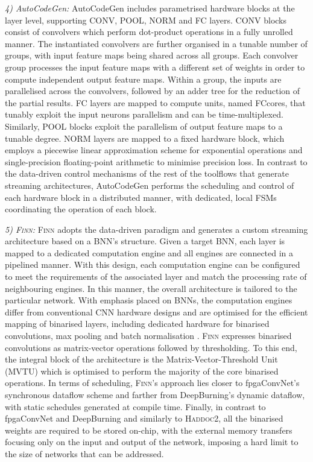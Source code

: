 \documentclass[format=acmsmall, review=false, screen=true]{acmart}
\begin{document}
{\color{black}\textit{4) AutoCodeGen:} 
AutoCodeGen includes parametrised hardware blocks at the layer level, supporting CONV, POOL, NORM and FC layers. CONV blocks consist of convolvers which perform dot-product operations in a fully unrolled manner. The instantiated convolvers are further organised in a tunable number of groups, with input feature maps being shared across all groups. Each convolver group processes the input feature maps with a different set of weights in order to compute independent output feature maps. Within a group, the inputs are parallelised across the convolvers, followed by an adder tree for the reduction of the partial results. FC layers are mapped to compute units, named FCcores, that tunably exploit the input neurons parallelism and can be time-multiplexed. Similarly, POOL blocks exploit the parallelism of output feature maps to a tunable degree. NORM layers are mapped to a fixed hardware block, which employs a piecewise linear approximation scheme for exponential operations and single-precision floating-point arithmetic to minimise precision loss. In contrast to the data-driven control mechanisms of the rest of the toolflows that generate streaming architectures, AutoCodeGen performs the scheduling and control of each hardware block in a distributed manner, with dedicated, local FSMs coordinating the operation of each block.

}


\textit{5) \textsc{Finn}:}
\textsc{Finn} adopts the data-driven paradigm and generates a custom streaming architecture based on a BNN's structure. Given a target BNN, each layer is mapped to a dedicated computation engine and all engines are connected in a pipelined manner. With this design, each computation engine can be configured to meet the requirements of the associated layer and match the processing rate of neighbouring engines. In this manner, the overall architecture is tailored to the particular network. With emphasis placed on BNNs, the computation engines differ from conventional CNN hardware designs and are optimised for the efficient mapping of binarised layers, including dedicated hardware for binarised convolutions, max pooling and batch normalisation \cite{icml2015_ioffe15}. \textsc{Finn} expresses binarised convolutions as matrix-vector operations followed by thresholding. To this end, the integral block of the architecture is the Matrix-Vector-Threshold Unit (MVTU) which is optimised to perform %
the majority of the core binarised operations. In terms of scheduling, \textsc{Finn}'s approach lies closer to fpgaConvNet's synchronous dataflow scheme and farther from DeepBurning's dynamic dataflow, with static schedules generated at compile time. %
Finally, in contrast to fpgaConvNet and DeepBurning {\color{black}and similarly to \textsc{Haddoc2}}, all the binarised weights are required to be stored on-chip, with the external memory transfers focusing only on the input and output of the network, imposing a hard limit to the size of networks that can be addressed.
\end{document}
